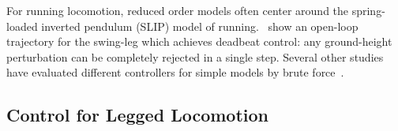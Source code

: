 For running locomotion, reduced order models often center around the spring-loaded inverted pendulum (SLIP) model of running.~\textcite{wu20133} show an open-loop trajectory for the swing-leg which achieves deadbeat control: any ground-height perturbation can be completely rejected in a single step.
Several other studies have evaluated different controllers for simple models by brute force~\cite{piovan2013two,cnops2015basin,piovan2015reachability}.



\subsection{Control for Legged Locomotion}



